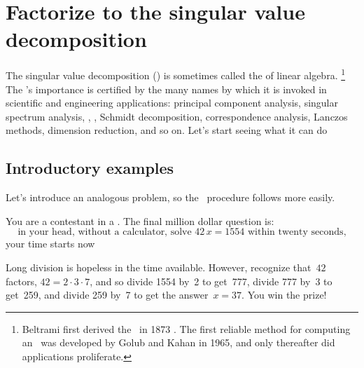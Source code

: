 

\section{Factorize to the singular value decomposition}
\label{sec:fisvd}
\secttoc

The singular value decomposition (\svd) is sometimes called the  of  linear algebra.%
\footnote{Beltrami first derived the \svd\ in 1873 \cite[]{Stewart1993}.  
The first reliable method for computing an \svd\ was developed by Golub and Kahan in 1965, and only thereafter did applications proliferate.}
The \svd's importance is certified by the many names by which it is invoked 
in scientific and engineering applications: principal component 
analysis, singular spectrum analysis, , , Schmidt decomposition, correspondence analysis, Lanczos methods, dimension reduction, and so on.
Let's start seeing what it can do 




\subsection{Introductory examples}
\label{sec:svdeg}

Let's introduce an analogous problem, so the \svd\ procedure follows more easily.

You are a contestant in a .
The final million dollar question is: 
\begin{equation*}
\text{in your head, without a calculator, solve \(42\,x=1554\) within twenty seconds,}
\end{equation*}
your time starts now \dotfill
\begin{solution} 
Long division is hopeless in the time available.  
However, recognize that~\(42\) factors, \(42=2\cdot3\cdot7\), and so divide 1554 by~2 to get~777, divide 777 by~3 to get~259, and divide 259 by~7 to get the answer~\(x=37\). 
You win the prize!
\end{solution}

